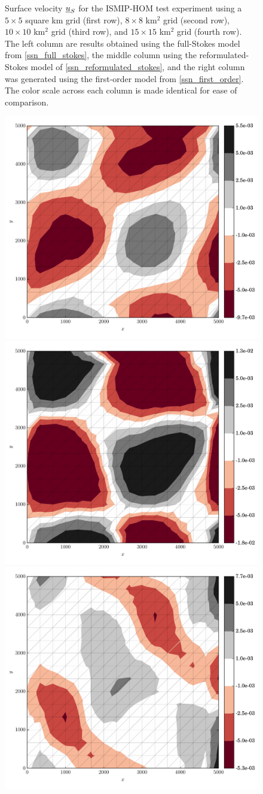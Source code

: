 \begin{figure}
  \caption[ISMIP-HOM momentum experiment velocities]{Surface velocity $\underline{u}_S$ for the ISMIP-HOM test experiment using a $5 \times 5$ square km grid (first row), $8 \times 8$ km$^2$ grid (second row), $10 \times 10$ km$^2$ grid (third row), and $15 \times 15$ km$^2$ grid (fourth row).  The left column are results obtained using the full-Stokes model from \cref{ssn_full_stokes}, the middle column using the reformulated-Stokes model of \cref{ssn_reformulated_stokes}, and the right column was generated using the first-order model from \cref{ssn_first_order}. The color scale across each column is made identical for ease of comparison. \newline}
  \label{ismip_hom_a_velocity}
\end{figure}

\begin{figure}
  \centering

    \includegraphics[width=0.3\linewidth]{images/momentum/ISMIP_HOM_A/xsmall/FS/divU.pdf}
    \quad                                           
    \includegraphics[width=0.3\linewidth]{images/momentum/ISMIP_HOM_A/xsmall/RS/divU.pdf}
    \quad                                           
    \includegraphics[width=0.3\linewidth]{images/momentum/ISMIP_HOM_A/xsmall/BP/divU.pdf}
                                                    

\end{figure}
